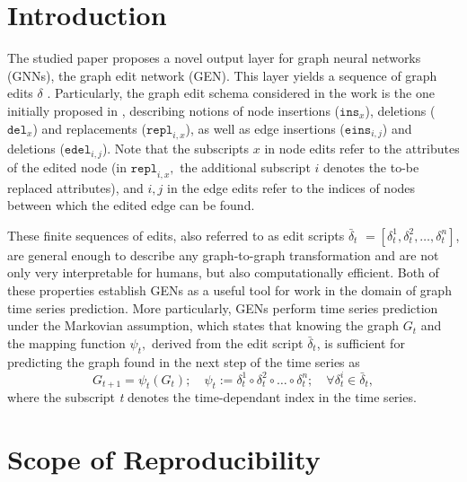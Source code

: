 \section{Introduction}

The studied paper proposes a novel output layer for graph neural networks (GNNs), the graph edit network (GEN). This layer yields a sequence of graph edits $\delta$ .
Particularly, the graph edit schema considered in the work is the one initially proposed in \cite{sanfeliu1983distance}, describing notions of node insertions ($\texttt{ins}_{x}$), deletions ($\texttt{del}_{x}$) and replacements ($\texttt{repl}_{i,x}$), as well as edge insertions ($\texttt{eins}_{i,j}$) and deletions ($\texttt{edel}_{i,j}$). Note that the subscripts $x$ in node edits refer to the attributes of the edited node (in $\texttt{repl}_{i,x},$ the additional subscript $i$ denotes the to-be replaced attributes), and $i,j$ in the edge edits refer to the indices of nodes between which the edited edge can be found. 

These finite sequences of edits, also referred to as edit scripts $\bar{\delta}_{t}$ $= [\delta^{1}_{t}, \delta^{2}_{t}, \dots, \delta^{n}_{t}]$, are general enough to describe any graph-to-graph transformation and are not only very interpretable for humans, but also computationally efficient. Both of these properties establish GENs as a useful tool for work in the domain of graph time series prediction. More particularly, GENs perform time series prediction under the Markovian assumption, which states that knowing the graph $G_{t}$ and the mapping function $\psi_{t},$ derived from the edit script $\bar{\delta}_{t}$, is sufficient for predicting the graph found in the next step of the time series as 
\begin{equation*}
    G_{t+1} = \psi_{t}(G_{t}); \quad \psi_{t} := \delta^{1}_{t} \circ \delta^{2}_{t} \circ \dots \circ \delta^{n}_{t}; \quad \forall \delta^{i}_{t} \in \bar{\delta}_{t},
\end{equation*} where the subscript \textit{t} denotes the time-dependant index in the time series.
\section{Scope of Reproducibility}
\label{sec:claims}

